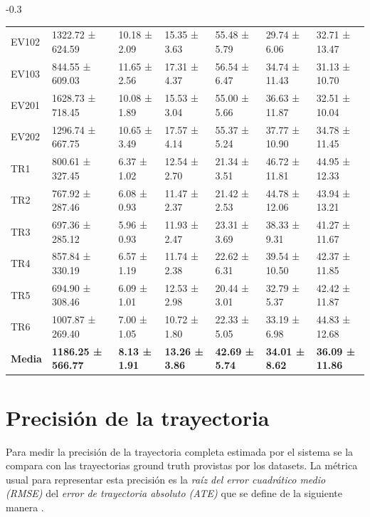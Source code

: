 \documentclass[ twoside,openright,titlepage,numbers=noenddot,%
                headinclude,footinclude,cleardoublepage=empty,abstract=on,
                BCOR=-5mm,paper=a4,fontsize=11pt
                ]{scrreprt}
\begin{document}
\begin{table}[H]
\begin{addmargin*}[-0.1\textwidth]{-0.3\textwidth}
{\begin{tabular}{ |l||l|l|l|l|l|l|  }
EV102  & 1322.72 ± 624.59  & 10.18 ± 2.09  & 15.35 ± 3.63   & 55.48 ± 5.79 & 29.74 ± 6.06  & 32.71 ± 13.47 \\
EV103  & 844.55 ± 609.03   & 11.65 ± 2.56  & 17.31 ± 4.37   & 56.54 ± 6.47 & 34.74 ± 11.43 & 31.13 ± 10.70 \\
EV201  & 1628.73 ± 718.45  & 10.08 ± 1.89  & 15.53 ± 3.04   & 55.00 ± 5.66 & 36.63 ± 11.87 & 32.51 ± 10.04 \\
EV202  & 1296.74 ± 667.75  & 10.65 ± 3.49  & 17.57 ± 4.14   & 55.37 ± 5.24 & 37.77 ± 10.90 & 34.78 ± 11.45 \\
TR1    & 800.61 ± 327.45   & 6.37 ± 1.02   & 12.54 ± 2.70   & 21.34 ± 3.51 & 46.72 ± 11.81 & 44.95 ± 12.33 \\
TR2    & 767.92 ± 287.46   & 6.08 ± 0.93   & 11.47 ± 2.37   & 21.42 ± 2.53 & 44.78 ± 12.06 & 43.94 ± 13.21 \\
TR3    & 697.36 ± 285.12   & 5.96 ± 0.93   & 11.93 ± 2.47   & 23.31 ± 3.69 & 38.33 ± 9.31  & 41.27 ± 11.67 \\
TR4    & 857.84 ± 330.19   & 6.57 ± 1.19   & 11.74 ± 2.38   & 22.62 ± 6.31 & 39.54 ± 10.50 & 42.37 ± 11.85 \\
TR5    & 694.90 ± 308.46   & 6.09 ± 1.01   & 12.53 ± 2.98   & 20.44 ± 3.01 & 32.79 ± 5.37  & 42.42 ± 11.87 \\
TR6    & 1007.87 ± 269.40  & 7.00 ± 1.05   & 10.72 ± 1.80   & 22.33 ± 5.05 & 33.19 ± 6.98  & 44.83 ± 12.68 \\
\hline
\textbf{Media} & \textbf{1186.25 ± 566.77} & \textbf{8.13 ± 1.91} & \textbf{13.26 ± 3.86} & \textbf{42.69 ± 5.74} & \textbf{34.01 ± 8.62} & \textbf{36.09 ± 11.86}\\
\hline
\end{tabular}
}
\end{addmargin*}
\end{table}

\hypertarget{precisiuxf3n-de-la-trayectoria}{%
\section{Precisión de la
trayectoria}\label{precisiuxf3n-de-la-trayectoria}}

Para medir la precisión de la trayectoria completa estimada por el
sistema se la compara con las trayectorias ground truth provistas por
los datasets. La métrica usual para representar esta precisión es la
\emph{raíz del error cuadrático medio (RMSE)} del \emph{error de
trayectoria absoluto (ATE)} que se define de la siguiente manera
\autocite{sturmBenchmarkEvaluationRGBD2012}.
\end{document}

